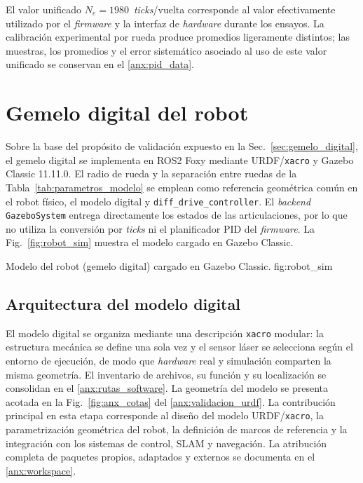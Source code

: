 El valor unificado $N_e=1980$~\textit{ticks}/vuelta corresponde al valor
efectivamente utilizado por el \textit{firmware} y la interfaz de \textit{hardware} durante
los ensayos. La calibración experimental por rueda produce promedios
ligeramente distintos; las muestras, los promedios y el error sistemático
asociado al uso de este valor unificado se conservan en el
\ref{anx:pid_data}.

\section{Gemelo digital del robot}
\label{ch:robot_digital}

Sobre la base del propósito de validación expuesto en la
Sec.~\ref{sec:gemelo_digital}, el gemelo digital se implementa en
\gls{ROS2} Foxy mediante URDF/\texttt{xacro} y Gazebo Classic 11.11.0. El radio de rueda y
la separación entre ruedas de la Tabla~\ref{tab:parametros_modelo} se
emplean como referencia geométrica común en el robot físico, el modelo
digital y \texttt{diff\_drive\_controller}. El \textit{backend}
\texttt{GazeboSystem} entrega directamente los estados de las
articulaciones, por lo que no utiliza la conversión por \textit{ticks} ni el
planificador PID del \textit{firmware}. La Fig.~\ref{fig:robot_sim} muestra el modelo
cargado en Gazebo Classic.

{Modelo del robot (gemelo digital) cargado en Gazebo Classic.}
{fig:robot_sim}

\subsection{Arquitectura del modelo digital}
\label{sec:atribucion}

El modelo digital se organiza mediante una descripción \texttt{xacro} modular: la estructura mecánica se define una sola vez y el sensor láser se selecciona según el entorno de ejecución, de modo que \textit{hardware} real y simulación comparten la misma geometría. El inventario de archivos, su función y su localización se consolidan en el \ref{anx:rutas_software}. La geometría del modelo se presenta acotada en la Fig.~\ref{fig:anx_cotas} del \ref{anx:validacion_urdf}.
La contribución principal en esta etapa corresponde al diseño del modelo URDF/\texttt{xacro}, la parametrización geométrica del robot, la definición de marcos de referencia y la integración con los sistemas de control, SLAM y navegación. La atribución completa de paquetes propios, adaptados y externos se documenta en el \ref{anx:workspace}.

